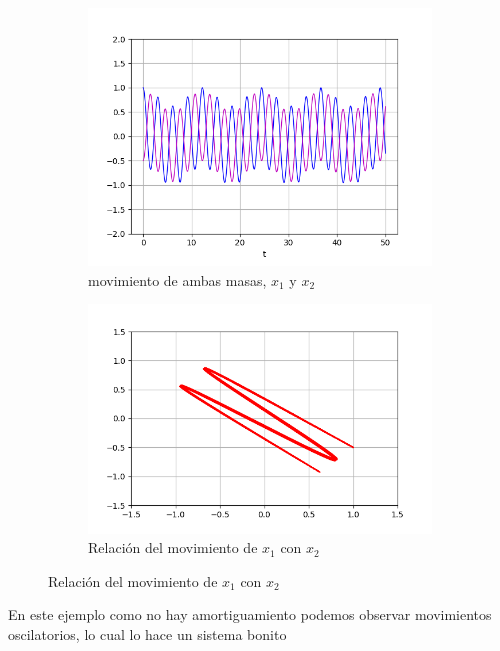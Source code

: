 \documentclass{article}
\begin{document}
\begin{figure}[ht!]
	\begin{subfigure}[b]{0.5\linewidth}
    \raggedleft
	\includegraphics[width=\linewidth]{ejercicio31-sync.png}
    \caption{movimiento de ambas masas, $x_1$ y $x_2$}
	\end{subfigure}
	\begin{subfigure}[b]{0.5\linewidth}
    \raggedright
	\includegraphics[width=\linewidth]{ejercicio31-versus.png}
	\caption{Relación del movimiento de $x_1$ con $x_2$}
    \end{subfigure}
\end{figure}

En este ejemplo como no hay amortiguamiento podemos observar movimientos oscilatorios, lo cual lo hace un sistema bonito
\end{document}
